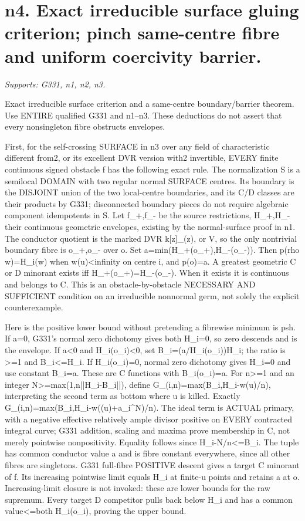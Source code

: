 \section{n4. Exact irreducible surface gluing criterion; pinch same-centre fibre and uniform coercivity barrier.}
\textit{Supports: G331, n1, n2, n3.}

Exact irreducible surface criterion and a same-centre boundary/barrier theorem. Use ENTIRE qualified G331 and n1--n3. These deductions do not assert that every nonsingleton fibre obstructs envelopes.

First, for the self-crossing SURFACE in n3 over any field of characteristic different from2, or its excellent DVR version with2 invertible, EVERY finite continuous signed obstacle f has the following exact rule. The normalization S is a semilocal DOMAIN with two regular normal SURFACE centres. Its boundary is the DISJOINT union of the two local-centre boundaries, and its C/D classes are their products by G331; disconnected boundary pieces do not require algebraic component idempotents in S. Let f\_+,f\_- be the source restrictions, H\_+,H\_- their continuous geometric envelopes, existing by the normal-surface proof in n1. The conductor quotient is the marked DVR k[z]\_(z), or V, so the only nontrivial boundary fibre is o\_+,o\_- over o. Set a=min(H\_+(o\_+),H\_-(o\_-)). Then
p(rho w)=H\_i(w) when w(u)\textless{}infinity on centre i, and p(o)=a.
A greatest geometric C or D minorant exists iff H\_+(o\_+)=H\_-(o\_-). When it exists it is continuous and belongs to C. This is an obstacle-by-obstacle NECESSARY AND SUFFICIENT condition on an irreducible nonnormal germ, not solely the explicit counterexample.

Here is the positive lower bound without pretending a fibrewise minimum is psh. If a=0, G331's normal zero dichotomy gives both H\_i=0, so zero descends and is the envelope. If a\textless{}0 and H\_i(o\_i)\textless{}0, set B\_i=(a/H\_i(o\_i))H\_i; the ratio is \textgreater{}=1 and B\_i\textless{}=H\_i. If H\_i(o\_i)=0, normal zero dichotomy gives H\_i=0 and use constant B\_i=a. These are C functions with B\_i(o\_i)=a. For n\textgreater{}=1 and an integer N\textgreater{}=max(1,n||H\_i-B\_i||), define
G\_(i,n)=max(B\_i,H\_i-w(u)/n), interpreting the second term as bottom where u is killed.
Exactly G\_(i,n)=max(B\_i,H\_i-w((u)+a\_i\textasciicircum{}N)/n). The ideal term is ACTUAL primary, with a negative effective relatively ample divisor positive on EVERY contracted integral curve; G331 addition, scaling and maxima prove membership in C, not merely pointwise nonpositivity. Equality follows since H\_i-N/n\textless{}=B\_i. The tuple has common conductor value a and is fibre constant everywhere, since all other fibres are singletons. G331 full-fibre POSITIVE descent gives a target C minorant of f. Its increasing pointwise limit equals H\_i at finite-u points and retains a at o. Increasing-limit closure is not invoked: these are lower bounds for the raw supremum. Every target D competitor pulls back below H\_i and has a common value\textless{}=both H\_i(o\_i), proving the upper bound.


